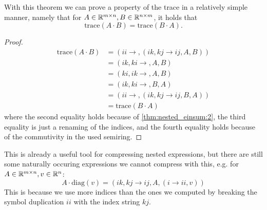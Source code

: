 

With this theorem we can prove a property of the trace in a relatively simple manner, namely that for $A \in \mathbb{R}^{m \times n}, B \in \mathbb{R}^{n \times m}$,
it holds that
$$\text{trace}(A \cdot B) = \text{trace}(B \cdot A).$$

\begin{proof}
    \small
    \begin{align*}
        \text{trace}(A \cdot B) & = (ii \rightarrow , (ik,kj \rightarrow ij, A, B)) \\
                                & = (ik, ki \rightarrow ,A, B)                      \\
                                & = (ki, ik \rightarrow ,A, B)                      \\
                                & = (ik, ki \rightarrow ,B, A)                      \\
                                & = (ii \rightarrow , (ik,kj \rightarrow ij, B, A)) \\
                                & = \text{trace}(B \cdot A)
    \end{align*}
    where the second equality holds because of \autoref{thm:nested_einsum:2},
    the third equality is just a renaming of the indices,
    and the fourth equality holds because of the commutivity in the used semiring.
\end{proof}

This is already a useful tool for compressing nested expressions, but there are still some naturally occuring expressions we cannot compress with this,
e.g. for $A \in \mathbb{R}^{m \times n}, v \in \mathbb{R}^{n}$:
$$A \cdot \text{diag}(v) = (ik, kj \rightarrow ij, A, (i \rightarrow ii, v))$$
This is because we use more indices than the ones we computed by breaking the symbol duplication $ii$ with the index string $kj$.



